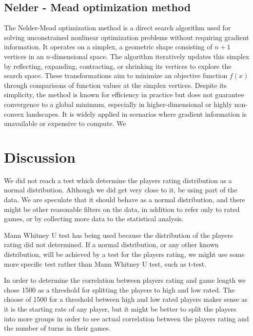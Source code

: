 \documentclass[conference]{IEEEtran}
\begin{document}
\subsection{Nelder - Mead optimization method}
The Nelder-Mead optimization method is a direct search algorithm used for solving unconstrained nonlinear optimization problems without requiring gradient information. It operates on a simplex, a geometric shape consisting of $n+1$ vertices in an $n$-dimensional space. The algorithm iteratively updates this simplex by reflecting, expanding, contracting, or shrinking its vertices to explore the search space. These transformations aim to minimize an objective function $f(x)$ through comparisons of function values at the simplex vertices. Despite its simplicity, the method is known for efficiency in practice but does not guarantee convergence to a global minimum, especially in higher-dimensional or highly non-convex landscapes. It is widely applied in scenarios where gradient information is unavailable or expensive to compute. We


\section{Discussion}
We did not reach a test which determine the players rating distribution as a normal distribution. Although we did get very close to it, be using part of the data. We are speculate that it should behave as a normal distribution, and there might be other reasonable filters on the data, in addition to refer only to rated games, or by collecting more data to the statistical analysis.

Mann Whitney U test has being used because the distribution of the players rating did not determined. If a normal distribution, or any other known distribution, will be achieved by a test for the players rating, we might use some more specific test rather than Mann Whitney U test, such as t-test.

In order to determine the correlation between players rating and game length we chose 1500 as a threshold for splitting the players to high and low rated. The choose of 1500 for a threshold between high and low rated players makes sense as it is the starting rate of any player, but it might be better to split the players into more groups in order to see actual correlation between the players rating and the number of turns in their games.

\newpage


\end{document}
